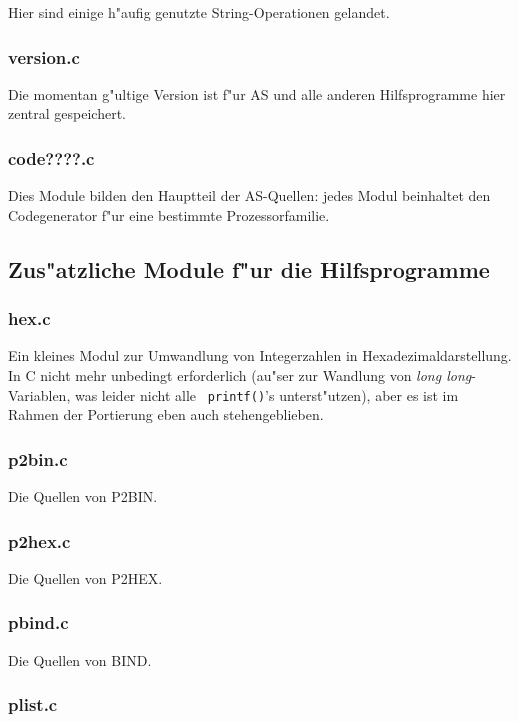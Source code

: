\documentclass[12pt,a4paper,twoside]{report}
\begin{document}
{Hier sind einige h"aufig genutzte String-Operationen gelandet.

\subsubsection{version.c}

Die momentan g"ultige Version ist f"ur AS und alle anderen Hilfsprogramme
hier zentral gespeichert.

\subsubsection{code????.c}

Dies Module bilden den Hauptteil der AS-Quellen: jedes Modul beinhaltet
den Codegenerator f"ur eine bestimmte Prozessorfamilie.

\subsection{Zus"atzliche Module f"ur die Hilfsprogramme}

\subsubsection{hex.c}

Ein kleines Modul zur Umwandlung von Integerzahlen in
Hexadezimaldarstellung.  In C nicht mehr unbedingt erforderlich (au"ser
zur Wandlung von {\em long long}-Variablen, was leider nicht alle {\tt
printf()}'s unterst"utzen), aber es ist im Rahmen der Portierung eben auch
stehengeblieben.

\subsubsection{p2bin.c}

Die Quellen von P2BIN.

\subsubsection{p2hex.c}

Die Quellen von P2HEX.

\subsubsection{pbind.c}

Die Quellen von BIND.

\subsubsection{plist.c}

}
\end{document}
